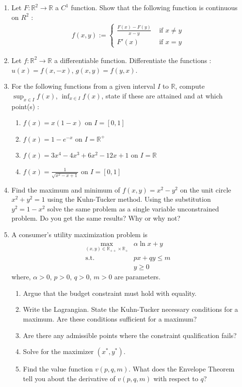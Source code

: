 \documentclass[11pt,letterpaper]{scrartcl}
\newcommand{\reals}{\mathbb{R}}
\begin{document}
\begin{enumerate}
	\item Let $F: \reals^2 \rightarrow \reals$ a $C^1$ function. Show that the following function is continuous on $R^2$ :
	\begin{align*}
	f(x,y):= \begin{cases}
	\frac{F(x)-F(y)}{x-y} & \text{ if } x \neq y
	\\
	F'(x) & \text{ if } x = y
	\end{cases}
	\end{align*}

	\item Let $f: \reals^2 \rightarrow \reals$ a differentiable function. Differentiate the functions : $u(x)=f(x,-x)$, $g(x,y)=f(y,x)$.

	\item For the following functions from a given interval $I$ to $\reals$, compute $\sup_{x \in I} f(x)$, $\inf_{x \in I} f(x)$, state if these are attained and at which point(s) :
	\begin{enumerate}
		\item $f(x)=x(1-x)$ on $I=[0,1]$
		\item $f(x)=1-e^{-x}$ on $I = \reals^+$
		\item $f(x)=3x^4 - 4x^3 + 6x^2 - 12x + 1$ on $I= \reals$
		\item $f(x)= \frac{1}{\sqrt{x^2-x+1}}$ on $I = [0,1]$
	\end{enumerate}
	


	\item Find the maximum and minimum of $f\left(x,y\right)=x^{2}-y^{2}$ on the unit circle $x^{2}+y^{2}=1$ using the Kuhn-Tucker method. Using the substitution $y^{2}=1-x^{2}$ solve the same problem as a single variable unconstrained problem. Do you get the same results? Why or why not?

	\item A consumer's utility maximization problem is
	\begin{align*}
	\max_{\left(x,y\right)\in\mathbb{R}_{++}\times\mathbb{R}_{+}} & \alpha\ln x+y\\
	\text{s.t.\ } & px+qy\leq m\\
	 & y\geq0
	\end{align*}
	where, $\alpha>0$, $p>0$, $q>0$, $m>0$ are parameters.
	\begin{enumerate}
	\item Argue that the budget constraint must hold with equality.
	\item Write the Lagrangian. State the Kuhn-Tucker necessary conditions for
	a maximum. Are these conditions sufficient for a maximum?
	\item Are there any admissible points where the constraint qualification
	fails?
	\item Solve for the maximizer $\left(x^{*},y^{*}\right)$.
	\item Find the value function $v\left(p,q,m\right)$. What does the Envelope
	Theorem tell you about the derivative of $v\left(p,q,m\right)$ with
	respect to $q$?
	\end{enumerate}


\end{enumerate}
\end{document}
